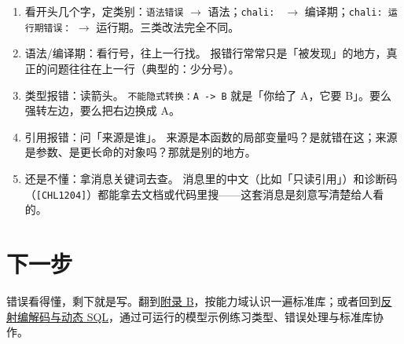 \begin{enumerate}

\item 看开头几个字，定类别：\texttt{语法错误} \ensuremath{\rightarrow} 语法；\texttt{chali:\allowbreak{} } \ensuremath{\rightarrow} 编译期；\texttt{chali:\allowbreak{} 运行期错误：} \ensuremath{\rightarrow} 运行期。三类改法完全不同。

\item 语法/编译期：看行号，往上一行找。 报错行常常只是「被发现」的地方，真正的问题往往在上一行（典型的：少分号）。

\item 类型报错：读箭头。 \texttt{不能隐式转换：A ->\allowbreak{} B} 就是「你给了 A，它要 B」。要么强转左边，要么把右边换成 A。

\item 引用报错：问「来源是谁」。 来源是本函数的局部变量吗？是就错在这；来源是参数、是更长命的对象吗？那就是别的地方。

\item 还是不懂：拿消息关键词去查。 消息里的中文（比如「只读引用」）和诊断码（\texttt{[\allowbreak{}CHL1204]\allowbreak{}}）都能拿去文档或代码里搜——这套消息是刻意写清楚给人看的。

\end{enumerate}

\section{下一步}

错误看得懂，剩下就是写。翻到\hyperref[ch:appB]{附录 B}，按能力域认识一遍标准库；或者回到\href{https://gitee.com/rabbitc999/chali/blob/master/doc/36-reflection-serialization-sql.md}{反射编解码与动态 SQL}，通过可运行的模型示例练习类型、错误处理与标准库协作。
